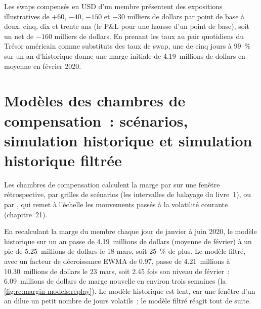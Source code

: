 \begin{example}\label{ex:rc:margin-models:book}
Les swaps compensés en USD d'un membre présentent des expositions illustratives de $+60$, $-40$, $-150$ et $-30$ milliers
de dollars par point de base à deux, cinq, dix et trente ans (le P\&L pour une hausse d'un point de base), soit un
net de $-160$ milliers de dollars. En prenant les taux au pair quotidiens du Trésor américain comme substituts des taux de swap, une  de cinq jours
à 99~\% sur un an d'historique donne une marge initiale de 4.19~millions de dollars en moyenne en
février 2020.
\end{example}

\section{Modèles des chambres de compensation~: scénarios, simulation historique et simulation historique filtrée}

Les chambres de compensation calculent la marge par  sur une fenêtre rétrospective, par grilles de scénarios (les
intervalles de balayage du livre~1), ou par , qui remet à l'échelle les mouvements passés
à la volatilité courante (chapitre~21).

\label{lst:rc:margin-models:hs}

\begin{example}\label{ex:rc:margin-models:replay}
En recalculant la marge du membre chaque jour de janvier à juin 2020, le modèle historique sur un an
passe de 4.19~millions de dollars (moyenne de février) à un pic de 5.25~millions de dollars le 18 mars, soit 25~\% de plus. Le
modèle filtré, avec un facteur de décroissance EWMA de 0.97, passe de 4.21~millions à 10.30~millions de dollars le 23 mars, soit 2.45
fois son niveau de février~: 6.09~millions de dollars de marge nouvelle en environ trois semaines
(la \cref{fig:rc:margin-models:replay}). Le modèle historique est lent, car une fenêtre d'un an dilue un
petit nombre de jours volatils~; le modèle filtré réagit tout de suite.
\end{example}

